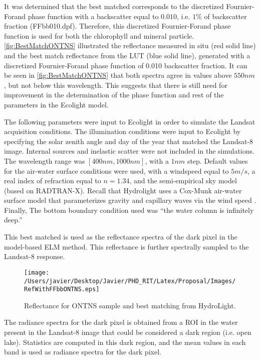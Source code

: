 It was determined that the best matched corresponds to the discretized Fournier-Forand phase function with a backscatter equal to $0.010$, i.e. $1\%$ of backscatter fraction (FFbb010.dpf). Therefore, this discretized Fournier-Forand phase function is used for both the chlorophyll and mineral particle. \autoref{fig:BestMatchONTNS} illustrated the reflectance measured in situ (red solid line) and the best match reflectance from the LUT (blue solid line), generated with a discretized Fournier-Forand phase function of 0.010 backscatter fraction. It can be seen in \autoref{fig:BestMatchONTNS} that both spectra agree in values above $550nm$, but not below this wavelength. This suggests that there is still need for improvement in the determination of the phase function and rest of the parameters in the Ecolight model.

The following parameters were input to Ecolight in order to simulate the Landsat acquisition conditions. The illumination conditions were input to Ecolight by specifying the solar zenith angle and day of the year that matched the Landsat-8 image. Internal sources and inelastic scatter were not included in the simulations. The wavelength range was $[400nm,1000nm]$, with a $1nm$ step. Default values for the air-water surface conditions were used, with a windspeed equal to $5m/s$, a real index of refraction equal to $n=1.34$, and the semi-empirical sky model (based on RADTRAN-X). Recall that Hydrolight uses a Cox-Munk air-water surface model that parameterizes gravity and capillary waves via the wind speed . Finally, The bottom boundary condition used was ``the water column is infinitely deep.''

This best matched is used as the reflectance spectra of the dark pixel in the model-based ELM method. This reflectance is further spectrally sampled to the Landsat-8 response. 

\begin{figure}[htb]
  	\centering
  	\texttt{[image: /Users/javier/Desktop/Javier/PHD\_RIT/Latex/Proposal/Images/RefWithFFbbONTNS.eps]}
  \caption{Reflectance for ONTNS sample and best matching from HydroLight. \label{fig:BestMatchONTNS} } 
\end{figure}

The radiance spectra for the dark pixel is obtained from a ROI in the water present in the Landsat-8 image that could be considered a dark region (i.e. open lake). Statistics are computed in this dark region, and the mean values in each band is used as radiance spectra for the dark pixel.

